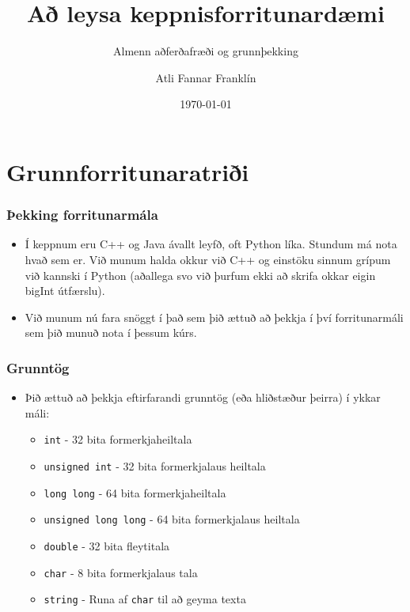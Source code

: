 \documentclass{beamer}
\title{Að leysa keppnisforritunardæmi}
\subtitle{Almenn aðferðafræði og grunnþekking}
\author{Atli Fannar Franklín}
\date{\today}
\begin{document}
\frame{\titlepage}

\section[Grunnforritunaratriði]{Grunnforritunaratriði}

\begin{frame}
\frametitle{Þekking forritunarmála}

\begin{itemize}

\item<1-> Í keppnum eru C++ og Java ávallt leyfð, oft Python líka. Stundum má nota hvað sem er. Við munum halda okkur við C++ og einstöku sinnum grípum við kannski í Python (aðallega svo við þurfum ekki að skrifa okkar eigin bigInt útfærslu).

\item<2-> Við munum nú fara snöggt í það sem þið ættuð að þekkja í því forritunarmáli sem þið munuð nota í þessum kúrs.

\end{itemize}

\end{frame}

\begin{frame}
\frametitle{Grunntög}

\begin{itemize}

\item<1-> Þið ættuð að þekkja eftirfarandi grunntög (eða hliðstæður þeirra) í ykkar máli: 

\begin{itemize}

\item<2-> \texttt{int} - 32 bita formerkjaheiltala

\item<3-> \texttt{unsigned int} - 32 bita formerkjalaus heiltala

\item<4-> \texttt{long long} - 64 bita formerkjaheiltala

\item<5-> \texttt{unsigned long long} - 64 bita formerkjalaus heiltala

\item<6-> \texttt{double} - 32 bita fleytitala

\item<7-> \texttt{char} - 8 bita formerkjalaus tala

\item<8-> \texttt{string} - Runa af \texttt{char} til að geyma texta

\end{itemize}

\end{itemize}

\end{frame}
\end{document}
